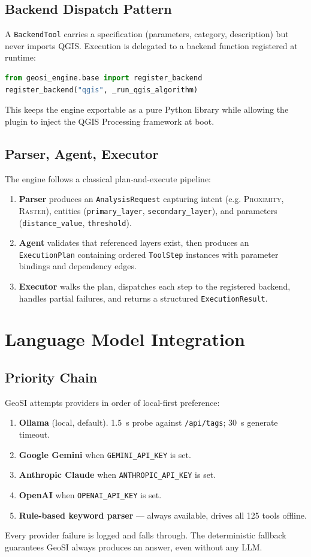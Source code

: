 \documentclass[11pt,a4paper]{article}
\begin{document}
\subsection{Backend Dispatch Pattern}
A \texttt{BackendTool} carries a specification (parameters, category,
description) but never imports QGIS. Execution is delegated to a
backend function registered at runtime:
\begin{lstlisting}[language=Python]
from geosi_engine.base import register_backend
register_backend("qgis", _run_qgis_algorithm)
\end{lstlisting}
This keeps the engine exportable as a pure Python library while
allowing the plugin to inject the QGIS Processing framework at boot.

\subsection{Parser, Agent, Executor}
The engine follows a classical plan-and-execute pipeline:
\begin{enumerate}[leftmargin=*]
  \item \textbf{Parser} produces an \texttt{AnalysisRequest} capturing
  intent (e.g. \textsc{Proximity}, \textsc{Raster}), entities
  (\texttt{primary\_layer}, \texttt{secondary\_layer}), and parameters
  (\texttt{distance\_value}, \texttt{threshold}).
  \item \textbf{Agent} validates that referenced layers exist, then
  produces an \texttt{ExecutionPlan} containing ordered \texttt{ToolStep}
  instances with parameter bindings and dependency edges.
  \item \textbf{Executor} walks the plan, dispatches each step to the
  registered backend, handles partial failures, and returns a
  structured \texttt{ExecutionResult}.
\end{enumerate}

\section{Language Model Integration}
\subsection{Priority Chain}
GeoSI attempts providers in order of local-first preference:
\begin{enumerate}[leftmargin=*]
  \item \textbf{Ollama} (local, default). 1.5~s probe against
  \texttt{/api/tags}; 30~s generate timeout.
  \item \textbf{Google Gemini} when \texttt{GEMINI\_API\_KEY} is set.
  \item \textbf{Anthropic Claude} when \texttt{ANTHROPIC\_API\_KEY} is set.
  \item \textbf{OpenAI} when \texttt{OPENAI\_API\_KEY} is set.
  \item \textbf{Rule-based keyword parser} --- always available, drives
  all 125 tools offline.
\end{enumerate}
Every provider failure is logged and falls through. The deterministic
fallback guarantees GeoSI always produces an answer, even without any
LLM.
\end{document}
